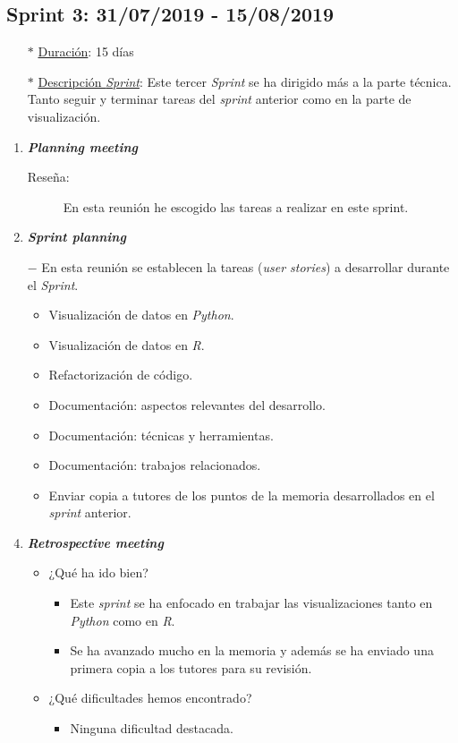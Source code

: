 \subsection{Sprint 3: 31/07/2019 - 15/08/2019}\label{sprint3}
\begin{itemize}
	\item[$\ast$] \underline{Duración}:  15 días
	\item[$\ast$] \underline{Descripción \textit{Sprint}}: Este tercer \textit{Sprint} se ha dirigido más a la parte técnica. Tanto seguir y terminar tareas del \textit{sprint }anterior como en la parte de visualización.
\end{itemize}
\begin{enumerate}
	\item \textbf{\textit{Planning meeting}}
	\begin{description}
		\item[Reseña:] En esta reunión he escogido las tareas a realizar en este sprint.
	\end{description}
	\item \textbf{\textit{Sprint planning}}
		\item[$-$] En esta reunión se establecen la tareas (\textit{user stories}) a desarrollar durante el \textit{Sprint}. 
	\begin{itemize}
		\item Visualización de datos en \textit{Python}.
		\item Visualización de datos en \textit{R}.
		\item Refactorización de código.
		\item Documentación: aspectos relevantes del desarrollo.
		\item Documentación: técnicas y herramientas.
		\item Documentación: trabajos relacionados.
		\item Enviar copia a tutores de los puntos de la memoria desarrollados en el \textit{sprint} anterior.
	\end{itemize}
	\item \textbf{\textit{Retrospective meeting}}
	\begin{itemize}
		\item ¿Qué ha ido bien?
		\begin{itemize}
			\item Este \textit{sprint} se ha enfocado en trabajar las visualizaciones tanto en \textit{Python} como en \textit{R}. 
			\item Se ha avanzado mucho en la memoria y además se ha enviado una primera copia a los tutores para su revisión.
		\end{itemize}
		\item ¿Qué dificultades hemos encontrado?
		\begin{itemize}
			\item Ninguna dificultad destacada. 
		\end{itemize}
	\end{itemize}	
\end{enumerate}

